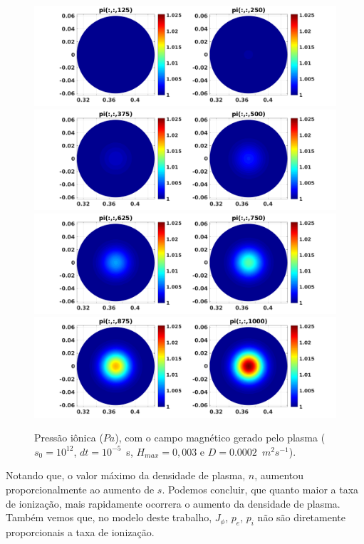 \documentclass[12pt,oneside,a4paper]{abntex2}
\begin{document}
\begin{figure}[H]
\centering
\includegraphics[scale=0.5]{../SImulacao_breakdown/PDE/pitod1B7.png}  
\includegraphics[scale=0.5]{../SImulacao_breakdown/PDE/pitod2B7.png} 
\includegraphics[scale=0.5]{../SImulacao_breakdown/PDE/pitod3B7.png} 
\includegraphics[scale=0.5]{../SImulacao_breakdown/PDE/pitod4B7.png} 
\caption{Pressão iônica ($Pa$), com o campo magnético gerado pelo plasma ($s_0=10^{12}$, $dt=10^{-5}$\ s, $H_{max} = 0,003$ e $D=0.0002$\ $m^2s^{-1}$).}
\label{campplasmasi3l4}
\end{figure}
\noindent Notando que, o valor máximo da densidade de plasma, $n$, aumentou proporcionalmente ao aumento de $s$. 
Podemos concluir, que quanto maior a taxa de ionização, mais rapidamente ocorrera o aumento da densidade de plasma. 
Também vemos que, no modelo deste trabalho, $J_\phi$, $p_e$, $p_i$ não são diretamente proporcionais a taxa de ionização.
\end{document}
